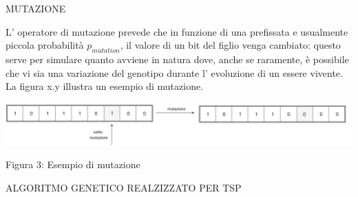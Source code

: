 \documentclass[11pt]{article}
\begin{document}
\vspace{2\baselineskip}
MUTAZIONE
\vspace{2\baselineskip}

L' operatore di mutazione prevede che in funzione di una prefissata e usualmente piccola probabilità $p_{mutation}$, il valore di un bit del figlio venga cambiato: questo serve per simulare quanto avviene in natura dove, anche se raramente, è possibile che vi sia una variazione del genotipo durante l' evoluzione di un essere vivente.
La figura x.y illustra un esempio di mutazione.


\begin{center}
\includegraphics[scale=0.5]{Mutazione}

Figura 3: Esempio di mutazione
\end{center}


\vspace{2\baselineskip}
ALGORITMO GENETICO REALZIZZATO PER TSP
\vspace{2\baselineskip}
\end{document}
